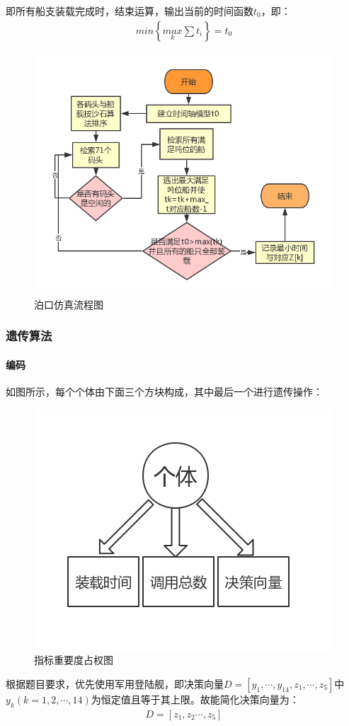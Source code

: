 \documentclass{whutmod}
\begin{document}
		即所有船支装载完成时，结束运算，输出当前的时间函数$t_{0}$，即：
			\begin{gather*}
		min \left \{ \underset{k}{max}\sum t_{i} \right \}=t_{0}
			\end{gather*}
    \begin{figure}[H]
	\centering
	\includegraphics[width=.9\textwidth]{figures/yyy.png}
	\caption{泊口仿真流程图}\label{dieyyrwen}
\end{figure}
	\subsubsection{遗传算法}
	 \paragraph{编码}
	 如图所示，每个个体由下面三个方块构成，其中最后一个进行遗传操作：
	 	\begin{figure}[H]
	 	\centering
	 	\includegraphics[width=.5\textwidth]{figures/yichuan.jpg}
	 	\caption{指标重要度占权图}\label{yichuan}
	 	 \end{figure}
	 根据题目要求，优先使用军用登陆舰，即决策向量$D=[y_{1},\cdots,y_{14},z_{1},\cdots,z_{5}]$中$y_{k}(k=1,2,\cdots,14)$为恒定值且等于其上限。故能简化决策向量为：
	\begin{gather*}
	D=[z_{1},z_{2}\cdots,z_{5}]
	\end{gather*}
\end{document}

